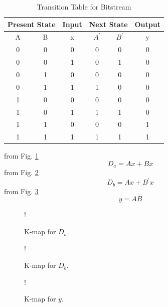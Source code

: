\documentclass[journal,12pt,twocolumn]{IEEEtran}
\begin{document}
\begin{enumerate}[1.]
\begin{table}[h!]
\begin{center}
\begin{tabular}{ |c|c|c|c|c|c| }
	\hline
	\multicolumn{2}{|c|}{Present State} &\multicolumn{1}{|c|}{Input} & \multicolumn{2}{|c|}{Next State} & \multicolumn{1}{|c|}{Output}  \\
	\hline
	A & B & x & $A^{\prime}$ & $B^{\prime}$ & y \\
	\hline
	0 & 0 & 0 & 0 & 0 & 0 \\
	\hline
	0 & 0 & 1 & 0 & 1 & 0 \\
	\hline
	0 & 1 & 0 & 0 & 0 & 0 \\
	\hline
	0 & 1 & 1 & 1 & 0 & 0 \\
	\hline
	1 & 0 & 0 & 0 & 0 & 0 \\
	\hline
	1 & 0 & 1 & 1 & 1 & 0 \\
	\hline
	1 & 1 & 0 & 0 & 0 & 1 \\
	\hline
	1 & 1 & 1 & 1 & 1 & 1 \\
	\hline
\end{tabular}
\end{center}
\caption{Transition Table for Bitstream}
\label{tab:bitstream}
\end{table}
from Fig. \ref{fig:kmap_da}
\begin{equation}
	D_a = Ax+Bx
\end{equation}
from Fig. \ref{fig:kmap_db}
\begin{equation}
	D_b = Ax+B^{\prime}x
\end{equation}
from Fig.  \ref{fig:kmap_y}
\begin{equation}
	y = AB 
\end{equation}
\begin{figure}[!h]
	\resizebox {\columnwidth} {!} {
		
	}
	\caption{K-map for $D_a$.}
	\label{fig:kmap_da}
\end{figure}
\begin{figure}[!h]
	\resizebox {\columnwidth} {!} {
		
	}
	\caption{K-map for $D_b$.}
	\label{fig:kmap_db}
\end{figure}
\begin{figure}[!h]
	\resizebox {\columnwidth} {!} {
		
	}
	\caption{K-map for $y$.}
	\label{fig:kmap_y}
\end{figure}
\end{enumerate}



	
	
	
%		

\end{document}
